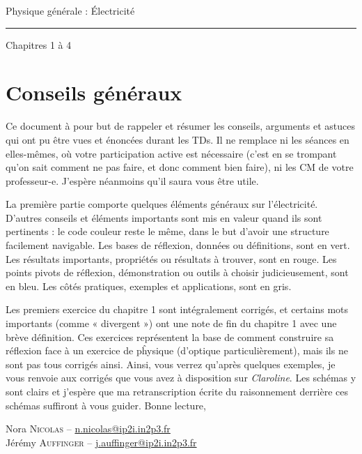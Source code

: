 \documentclass[10pt,a5paper,notitlepage]{book}
\begin{document}
\begin{center}
\Huge Physique générale : Électricité\smallbreak\vspace*{-14pt}
\rule[11pt]{5cm}{0.5pt}\smallbreak\vspace*{-14pt}
\huge Chapitres 1 à 4
\end{center}

\toccontents

\setcounter{chapter}{-1}
\chapter{Conseils généraux}
\vspace*{-55pt}
Ce document à pour but de rappeler et résumer les conseils, arguments et astuces
qui ont pu être vues et énoncées durant les TDs. Il ne remplace ni les séances
en elles-mêmes, où votre participation active est nécessaire (c'est en se
trompant qu'on sait comment ne pas faire, et donc comment bien faire), ni les CM
de votre professeur-e. J'espère néanmoins qu'il saura vous être utile.
\smallbreak

La première partie comporte quelques éléments généraux sur l'électricité.
D'autres conseils et éléments importants sont mis en valeur quand ils sont
pertinents : le code couleur reste le même, dans le but d'avoir une structure
facilement navigable. Les bases de réflexion, données ou définitions, sont en
vert. Les résultats importants, propriétés ou résultats à trouver, sont en
rouge. Les points pivots de réflexion, démonstration ou outils à choisir
judicieusement, sont en bleu. Les côtés pratiques, exemples et applications,
sont en gris. \smallbreak

Les premiers exercice du chapitre 1 sont intégralement corrigés, et certains
mots importants (comme « divergent ») ont une note de fin du chapitre 1 avec une
brève définition. Ces exercices représentent la base de comment construire sa
réflexion face à un exercice de pĥysique (d'optique particulièrement), mais ils
ne sont pas tous corrigés ainsi. Ainsi, vous verrez qu'après quelques exemples,
je vous renvoie aux corrigés que vous avez à disposition sur \textit{Claroline}.
Les schémas y sont clairs et j'espère que ma retranscription écrite du
raisonnement derrière ces schémas suffiront à vous guider. \hfill Bonne lecture,
\smallbreak

Nora \textsc{Nicolas} --
\href{mailto:n.nicolas@ip2i.in2p3.fr}{n.nicolas@ip2i.in2p3.fr}\\
Jérémy \textsc{Auffinger} --
\href{mailto:j.auffinger@ip2i.in2p3.fr}{j.auffinger@ip2i.in2p3.fr}\\
\end{document}
